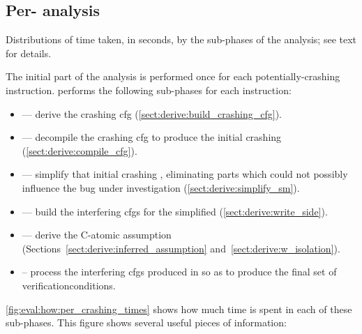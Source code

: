 \subsection{Per- analysis}

\begin{sanefig}
  \caption{Distributions of time taken, in seconds, by the
     sub-phases of the analysis; see text for details.}
  \label{fig:eval:how:per_crashing_times}
\end{sanefig}

\noindent
The initial part of the analysis is performed once for each
potentially-crashing instruction.  {\Technique} performs the following
sub-phases for each instruction:
\begin{itemize}
\item {} --- derive the crashing \gls{cfg}
  (\autoref{sect:derive:build_crashing_cfg}).
\item {} --- decompile the crashing \gls{cfg} to produce the
  initial crashing {\StateMachine}
  (\autoref{sect:derive:compile_cfg}).
\item {} --- simplify that initial crashing {\StateMachine},
  eliminating parts which could not possibly influence the bug under
  investigation (\autoref{sect:derive:simplify_sm}).
\item {} --- build the interfering \glspl{cfg} for the
  simplified {\StateMachine} (\autoref{sect:derive:write_side}).
\item {} --- derive the C-atomic assumption
  (Sections~\ref{sect:derive:inferred_assumption}
  and~\ref{sect:derive:w_isolation}).
\item {} -- process the interfering \glspl{cfg} produced in
   so as to produce the final set of
  \glspl{verificationcondition}.
\end{itemize}
\autoref{fig:eval:how:per_crashing_times} shows how much time is spent
in each of these sub-phases.  This figure shows several useful pieces
of information:
